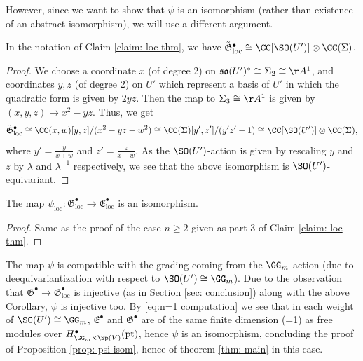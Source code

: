 \documentclass[11pt]{article}
\begin{document}
\begin{appendices}
However, since we want to show that $\psi$ is an isomorphism (rather than existence of an abstract isomorphism), we will use a different argument.

\begin{lemma}
    In the notation of Claim \ref{claim: loc thm}, we have $\tilde{\mathfrak{G}}^\bullet_\mathrm{loc}\cong \CC[\SO(U')]\otimes \CC(\Sigma)$.
\end{lemma}
\begin{proof}
    We choose a coordinate $x$ (of degree 2) on $\mathfrak{so}(U')^*\cong \Sigma_2\cong \AA^1$, and coordinates $y,z$ (of degree 2) on $U'$ which represent a basis of $U'$ in which the quadratic form is given by $2yz$. Then the map to $\Sigma_3\cong \AA^1$ is given by $(x,y,z)\mapsto x^2-yz$. Thus, we get
    $$\tilde{\mathfrak{G}}^\bullet_\mathrm{loc}\cong \CC(x,w)[y,z] / (x^2 - yz-w^2)\cong \CC(\Sigma)[y', z'] / (y'z'-1)\cong \CC[\SO(U')]\otimes \CC(\Sigma),$$
    where $y' = \frac{y}{x+w}$ and $z' = \frac{z}{x-w}$. As the $\SO(U')$-action is given by rescaling $y$ and $z$ by $\lambda$ and $\lambda^{-1}$ respectively, we see that the above isomorphism is $\SO(U')$-equivariant.
\end{proof}
\begin{corollary}
    The map $\psi_\mathrm{loc}:\mathfrak{G}^\bullet_\mathrm{loc}\to \mathfrak{E}^\bullet_\mathrm{loc}$ is an isomorphism.
\end{corollary}
\begin{proof}
    Same as the proof of the case $n\geq 2$ given as part 3 of Claim \ref{claim: loc thm}.
\end{proof}

The map $\psi$ is compatible with the grading coming from the $\GG_m$ action (due to deequivariantization with respect to $\SO(U')\cong\GG_m$). Due to the observation that $\mathfrak{G}^\bullet\to \mathfrak{G}^\bullet_\mathrm{loc}$ is injective (as in Section \ref{sec: conclusion}) along with the above Corollary, $\psi$ is injective too. By \eqref{eq:n=1 computation} we see that in each weight of $\SO(U')\cong \GG_m$, $\mathfrak{E}^\bullet$ and $\mathfrak{G}^\bullet$ are of the same finite dimension (=1) as free modules over $H^\bullet_{\GG_m\times \Sp(V)}(\mathrm{pt})$, hence $\psi$ is an isomorphism, concluding the proof of Proposition \ref{prop: psi isom}, hence of theorem \ref{thm: main} in this case.


\end{appendices}
\end{document}
